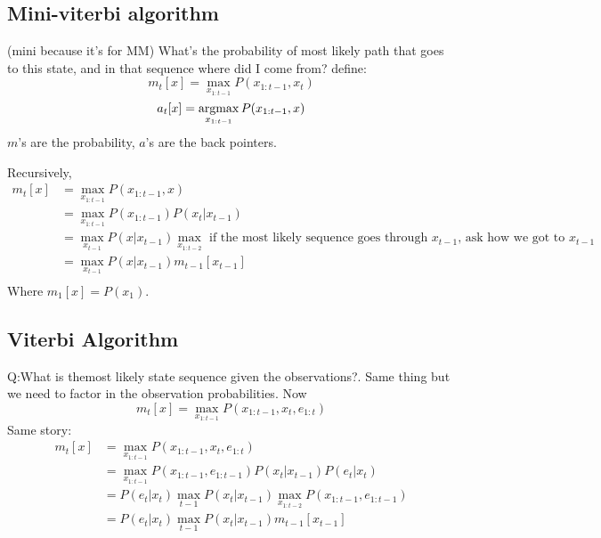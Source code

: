 \subsection{Mini-viterbi algorithm} (mini because it's for MM)
What's the probability of most likely path that goes to this state,
and in that sequence where did I come from?
define: $$m_t[x] = \max_{x_{1:t-1}}P(x_{1:t-1}, x_t)$$
$$a_t[x]=\argmax_{x_{1:t-1}}P(x_{1:t-1}, x)$$
$m$'s are the probability, $a$'s are the back pointers.

Recursively, 
\begin{align*}
  m_t[x] &= \max_{x_{1:t-1}}P(x_{1:t-1}, x)\\
&=\max_{x_{1:t-1}}P(x_{1:t-1})P(x_t|x_{t-1})\\
&=\max_{x_{t-1}}P(x|x_{t-1})\max_{x_{1:t-2}} \text{ if the most likely
sequence goes through $x_{t-1}$, ask how we got to $x_{t-1}$ }\\
&=\max_{x_{t-1}}P(x|x_{t-1})m_{t-1}[x_{t-1}]\\
\end{align*}
Where $m_1[x] = P(x_1)$.

\subsection{Viterbi Algorithm}
Q:What is themost likely state sequence given the observations?. Same
thing but we need to factor in the observation probabilities.
Now $$m_t[x] = \max_{x_{1:t-1}}P(x_{1:t-1}, x_t, e_{1:t})$$
Same story:
\begin{align*}
  m_t[x] &=\max_{x_{1:t-1}}P(x_{1:t-1}, x_t, e_{1:t})\\
&=\max_{x_{1:t-1}}P(x_{1:t-1}, e_{1:t-1})P(x_t|x_{t-1})P(e_t|x_t)\\
&=P(e_t|x_t)\max_{t-1}P(x_t|x_{t-1})\max_{x_{1:t-2}}P(x_{1:t-1},
e_{1:t-1})\\
&=P(e_t|x_t)\max_{t-1}P(x_t|x_{t-1})m_{t-1}[x_{t-1}]\\
\end{align*}

